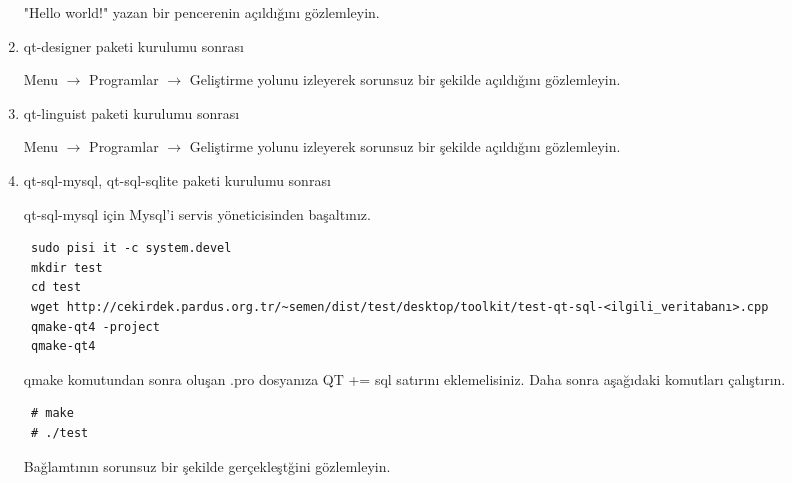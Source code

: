 \documentclass[a4paper,10pt]{article}
\begin{document}
\begin{enumerate}
"Hello world!" yazan bir pencerenin açıldığını gözlemleyin.
\item qt-designer paketi kurulumu sonrası

Menu $\rightarrow$ Programlar $\rightarrow$ Geliştirme yolunu izleyerek sorunsuz bir şekilde açıldığını gözlemleyin.

\item qt-linguist paketi kurulumu sonrası

Menu $\rightarrow$ Programlar $\rightarrow$ Geliştirme yolunu izleyerek sorunsuz bir şekilde açıldığını gözlemleyin.

\item qt-sql-mysql, qt-sql-sqlite paketi kurulumu sonrası

qt-sql-mysql için Mysql'i servis yöneticisinden başaltınız.
\begin{verbatim}
 sudo pisi it -c system.devel
 mkdir test
 cd test
 wget http://cekirdek.pardus.org.tr/~semen/dist/test/desktop/toolkit/test-qt-sql-<ilgili_veritabanı>.cpp
 qmake-qt4 -project
 qmake-qt4	
\end{verbatim}
qmake komutundan sonra oluşan .pro dosyanıza QT += sql satırını eklemelisiniz. Daha sonra aşağıdaki komutları çalıştırın.
\begin{verbatim}
 # make
 # ./test
\end{verbatim}

Bağlamtının sorunsuz bir şekilde gerçekleştğini gözlemleyin.

\end{enumerate}
\end{document}
